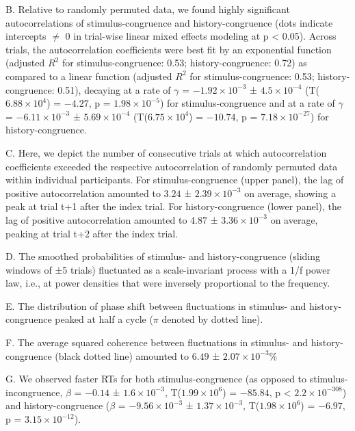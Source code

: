 \documentclass[
]{article}
\begin{document}
B. Relative to randomly permuted data, we found highly significant
autocorrelations of stimulus-congruence and history-congruence (dots
indicate intercepts \(\neq\) 0 in trial-wise linear mixed effects
modeling at p \textless{} 0.05). Across trials, the autocorrelation
coefficients were best fit by an exponential function (adjusted \(R^2\)
for stimulus-congruence: 0.53; history-congruence: 0.72) as compared to
a linear function (adjusted \(R^2\) for stimulus-congruence: 0.53;
history-congruence: 0.51), decaying at a rate of \(\gamma\) =
\(\ensuremath{-1.92\times 10^{-3}}\) ±
\(\ensuremath{4.5\times 10^{-4}}\)
(T(\(\ensuremath{6.88\times 10^{4}}\)) = \(-4.27\), p =
\(\ensuremath{1.98\times 10^{-5}}\)) for stimulus-congruence and at a
rate of \(\gamma\) = \(\ensuremath{-6.11\times 10^{-3}}\) ±
\(\ensuremath{5.69\times 10^{-4}}\)
(T(\(\ensuremath{6.75\times 10^{4}}\)) = \(-10.74\), p =
\(\ensuremath{7.18\times 10^{-27}}\)) for history-congruence.

C. Here, we depict the number of consecutive trials at which
autocorrelation coefficients exceeded the respective autocorrelation of
randomly permuted data within individual participants. For
stimulus-congruence (upper panel), the lag of positive autocorrelation
amounted to \(3.24\) ± \(\ensuremath{2.39\times 10^{-3}}\) on average,
showing a peak at trial t+1 after the index trial. For
history-congruence (lower panel), the lag of positive autocorrelation
amounted to \(4.87\) ± \(\ensuremath{3.36\times 10^{-3}}\) on average,
peaking at trial t+2 after the index trial.

D. The smoothed probabilities of stimulus- and history-congruence
(sliding windows of ±5 trials) fluctuated as a scale-invariant process
with a 1/f power law, i.e., at power densities that were inversely
proportional to the frequency.

E. The distribution of phase shift between fluctuations in stimulus- and
history-congruence peaked at half a cycle (\(\pi\) denoted by dotted
line).

F. The average squared coherence between fluctuations in stimulus- and
history-congruence (black dotted line) amounted to \(6.49\) ±
\(\ensuremath{2.07\times 10^{-3}}\)\%

G. We observed faster RTs for both stimulus-congruence (as opposed to
stimulus-incongruence, \(\beta\) = \(-0.14\) ±
\(\ensuremath{1.6\times 10^{-3}}\),
T(\(\ensuremath{1.99\times 10^{6}}\)) = \(-85.84\), p < \(\ensuremath{2.2\times 10^{-308}}\)) and
history-congruence (\(\beta\) = \(\ensuremath{-9.56\times 10^{-3}}\) ±
\(\ensuremath{1.37\times 10^{-3}}\),
T(\(\ensuremath{1.98\times 10^{6}}\)) = \(-6.97\), p =
\(\ensuremath{3.15\times 10^{-12}}\)).
\end{document}
